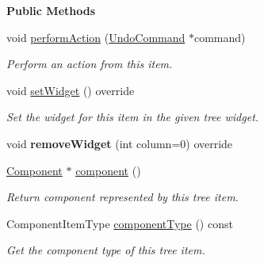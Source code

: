 \begin{Indent}\textbf{ Public Methods}\par
\begin{DoxyCompactItemize}
\item 
\mbox{\label{classrev_1_1_view_1_1_component_item_af5a38c8f4ac22951d9ec4886667c83d0}} 
void \mbox{\hyperlink{classrev_1_1_view_1_1_component_item_af5a38c8f4ac22951d9ec4886667c83d0}{perform\+Action}} (\mbox{\hyperlink{classrev_1_1_undo_command}{Undo\+Command}} $\ast$command)
\begin{DoxyCompactList}\small\item\em Perform an action from this item. \end{DoxyCompactList}\item 
void \mbox{\hyperlink{classrev_1_1_view_1_1_component_item_a0f694632880dffcee4c0225e9e022bb9}{set\+Widget}} () override
\begin{DoxyCompactList}\small\item\em Set the widget for this item in the given tree widget. \end{DoxyCompactList}\item 
\mbox{\label{classrev_1_1_view_1_1_component_item_ac825ab3e2f38c4b02ced8bd97f93e4e9}} 
void {\bfseries remove\+Widget} (int column=0) override
\item 
\mbox{\label{classrev_1_1_view_1_1_component_item_a40d3b3bc333954297e9239d42e6b3b43}} 
\mbox{\hyperlink{classrev_1_1_component}{Component}} $\ast$ \mbox{\hyperlink{classrev_1_1_view_1_1_component_item_a40d3b3bc333954297e9239d42e6b3b43}{component}} ()
\begin{DoxyCompactList}\small\item\em Return component represented by this tree item. \end{DoxyCompactList}\item 
\mbox{\label{classrev_1_1_view_1_1_component_item_ab04516f5aceb0cb18fccd841e3868762}} 
Component\+Item\+Type \mbox{\hyperlink{classrev_1_1_view_1_1_component_item_ab04516f5aceb0cb18fccd841e3868762}{component\+Type}} () const
\begin{DoxyCompactList}\small\item\em Get the component type of this tree item. \end{DoxyCompactList}\item 

\end{DoxyCompactItemize}
\end{Indent}
